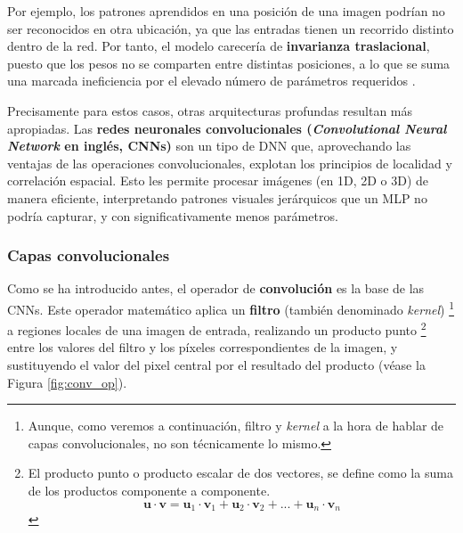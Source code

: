 Por ejemplo, los patrones aprendidos en una posición de una imagen podrían no ser reconocidos en otra 
ubicación, ya que las entradas tienen un recorrido distinto dentro de la red. Por tanto, el modelo carecería       %
de \textbf{invarianza traslacional}, puesto que los pesos no se comparten entre distintas posiciones, a lo que 
se suma una marcada ineficiencia por el elevado número de parámetros requeridos \cite{szeliski2010}.

Precisamente para estos casos, otras arquitecturas profundas resultan más apropiadas.
Las \textbf{redes neuronales convolucionales (\textit{Convolutional Neural Network} en inglés, CNNs)} son un 
tipo de DNN que, aprovechando las ventajas de las operaciones convolucionales, explotan los principios de 
localidad y correlación espacial. Esto les permite procesar imágenes (en 1D, 2D o 3D) de manera eficiente, 
interpretando patrones visuales jerárquicos que un MLP no podría capturar, y con significativamente menos 
parámetros.


\subsubsection{Capas convolucionales}

Como se ha introducido antes, el operador de \textbf{convolución} es la base de las CNNs. Este operador 
matemático aplica un \textbf{filtro} (también denominado \textit{kernel})
\footnote{
    Aunque, como veremos a continuación, filtro y \textit{kernel} a la hora de hablar de capas 
    convolucionales, no son técnicamente lo mismo.
} 
a regiones locales de una imagen de entrada, realizando un producto punto
\footnote{
    El producto punto o producto escalar de dos vectores, se define como la suma de los productos componente a 
    componente. 
    $$
    \mathbf{u} \cdot \mathbf{v} = \mathbf{u}_1 \cdot \mathbf{v}_1 + \mathbf{u}_2 \cdot \mathbf{v}_2 + ... + 
    \mathbf{u}_n \cdot \mathbf{v}_n
    $$
} 
entre los valores del filtro y los píxeles correspondientes de la imagen, y sustituyendo el valor del pixel 
central por el resultado del producto (véase la Figura \ref{fig:conv_op}).

